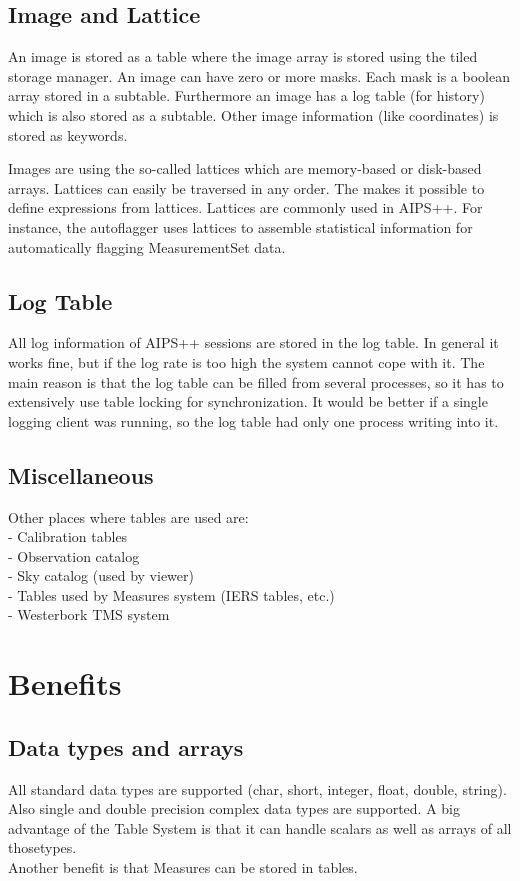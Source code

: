 \subsection{Image and Lattice}
An image is stored as a table where the image array is stored using
the tiled storage manager. An image can have zero or more masks. Each
mask is a boolean array stored in a subtable. Furthermore an image has
a log table (for history) which is also stored as a subtable. Other
image information (like coordinates) is stored as keywords.

Images are using the so-called lattices which are memory-based or
disk-based arrays. Lattices can easily be traversed in any order.
The 
makes it possible to define expressions from lattices.
Lattices are commonly used in AIPS++. For instance, the autoflagger
uses lattices to assemble statistical information for automatically
flagging MeasurementSet data.

\subsection{Log Table}
All log information of AIPS++ sessions are stored in the log table.
In general it works fine, but if the log rate is too high the system
cannot cope with it. The main reason is that the log table can be
filled from several processes, so it has to extensively use table
locking for synchronization. It would be better if a single logging
client was running, so the log table had only one process writing into
it.

\subsection{Miscellaneous}
Other places where tables are used are:
\\- Calibration tables
\\- Observation catalog
\\- Sky catalog (used by viewer)
\\- Tables used by Measures system (IERS tables, etc.)
\\- Westerbork TMS system

\section{Benefits}
\subsection{Data types and arrays}
All standard data types are supported (char, short, integer, float,
double, string).
Also single and double precision complex data types are supported.
A big advantage of the Table System is that it can handle scalars as well
as arrays of all thosetypes.
\\Another benefit is that Measures can be stored in tables.

